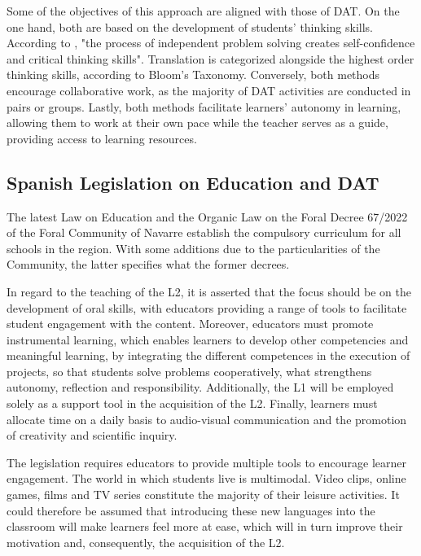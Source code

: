 Some of the objectives of this approach are aligned with those of DAT.
On the one hand, both are based on the development of
students' thinking skills. According to \textcite[p. 214]{ghaffari2017montessori}, "the process of independent
problem solving creates self-confidence and critical thinking skills".
Translation is categorized alongside the highest order thinking skills,
according to Bloom's Taxonomy. Conversely, both methods
encourage collaborative work, as the majority of DAT activities are
conducted in pairs or groups. Lastly, both methods facilitate
learners' autonomy in learning, allowing them to work
at their own pace while the teacher serves as a guide, providing access
to learning resources.

\subsection{Spanish Legislation on Education and DAT}\label{sub-sec-spanishlegislationoneducationanddat}

The latest Law on Education \cite{lomloe2020} and the Organic Law on the
Foral Decree 67/2022 of the Foral Community of Navarre establish the
compulsory curriculum for all schools in the region. With some additions
due to the particularities of the Community, the latter specifies what
the former decrees.

In regard to the teaching of the L2, it is asserted that the focus
should be on the development of oral skills, with educators providing a
range of tools to facilitate student engagement with the content.
Moreover, educators must promote instrumental learning, which enables
learners to develop other competencies and meaningful learning, by
integrating the different competences in the execution of projects, so
that students solve problems cooperatively, what strengthens autonomy,
reflection and responsibility. Additionally, the L1 will be employed
solely as a support tool in the acquisition of the L2. Finally, learners
must allocate time on a daily basis to audio-visual communication and
the promotion of creativity and scientific inquiry.

The legislation requires educators to provide multiple tools to
encourage learner engagement. The world in which students live is
multimodal. Video clips, online games, films and TV series constitute
the majority of their leisure activities. It could therefore be assumed
that introducing these new languages into the classroom will make
learners feel more at ease, which will in turn improve their motivation
and, consequently, the acquisition of the L2.

